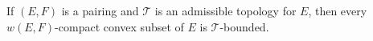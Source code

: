 If $(E,F)$ is a pairing and $\mathcal{T}$ is an admissible topology for $E$, then every $w(E,F)$-compact convex subset of $E$ is $\mathcal{T}$-bounded.
